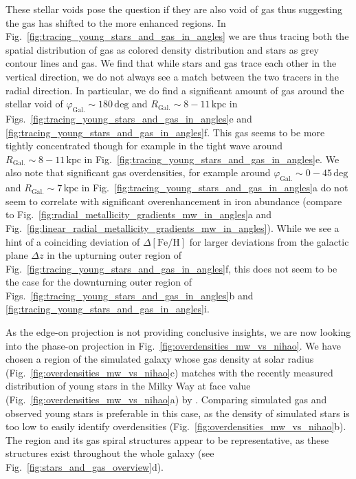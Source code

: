 \documentclass[twocolumn,apj,numberedappendix,appendixfloats]{openjournal}
\begin{document}
\begin{CJK*}{UTF8}{gbsn}
These stellar voids pose the question if they are also void of gas thus suggesting the gas has shifted to the more enhanced regions. In Fig.~\ref{fig:tracing_young_stars_and_gas_in_angles} we are thus tracing both the spatial distribution of gas as colored density distribution and stars as grey contour lines and gas. We find that while stars and gas trace each other in the vertical direction, we do not always see a match between the two tracers in the radial direction. In particular, we do find a significant amount of gas around the stellar void of $\varphi_\mathrm{Gal.} \sim 180\,\mathrm{deg}$ and ${R_\mathrm{Gal.} \sim 8-11\,\mathrm{kpc}}$ in Figs.~\ref{fig:tracing_young_stars_and_gas_in_angles}e and \ref{fig:tracing_young_stars_and_gas_in_angles}f. This gas seems to be more tightly concentrated though for example in the tight wave around $R_\mathrm{Gal.} \sim 8-11\,\mathrm{kpc}$ in Fig.~\ref{fig:tracing_young_stars_and_gas_in_angles}e. We also note that significant gas overdensities, for example around $\varphi_\mathrm{Gal.} \sim 0-45\,\mathrm{deg}$ and $R_\mathrm{Gal.} \sim 7\,\mathrm{kpc}$ in Fig.~\ref{fig:tracing_young_stars_and_gas_in_angles}a do not seem to correlate with significant overenhancement in iron abundance (compare to Fig.~\ref{fig:radial_metallicity_gradients_mw_in_angles}a and Fig.~\ref{fig:linear_radial_metallicity_gradients_mw_in_angles}). While we see a hint of a coinciding deviation of $\Delta\mathrm{[Fe/H]}$ for larger deviations from the galactic plane $\Delta z$ in the upturning outer region of Fig.~\ref{fig:tracing_young_stars_and_gas_in_angles}f, this does not seem to be the case for the downturning outer region of Figs.~\ref{fig:tracing_young_stars_and_gas_in_angles}b and \ref{fig:tracing_young_stars_and_gas_in_angles}i.

As the edge-on projection is not providing conclusive insights, we are now looking into the phase-on projection in Fig.~\ref{fig:overdensities_mw_vs_nihao}. We have chosen a region of the simulated galaxy whose gas density at solar radius (Fig.~\ref{fig:overdensities_mw_vs_nihao}c) matches with the recently measured distribution of young stars in the Milky Way at face value (Fig.~\ref{fig:overdensities_mw_vs_nihao}a) by \citet{Poggio2021}. Comparing simulated gas and observed young stars is preferable in this case, as the density of simulated stars is too low to easily identify overdensities (Fig.~\ref{fig:overdensities_mw_vs_nihao}b). The region and its gas spiral structures appear to be representative, as these structures exist throughout the whole galaxy (see Fig.~\ref{fig:stars_and_gas_overview}d).


\end{CJK*}
\end{document}
